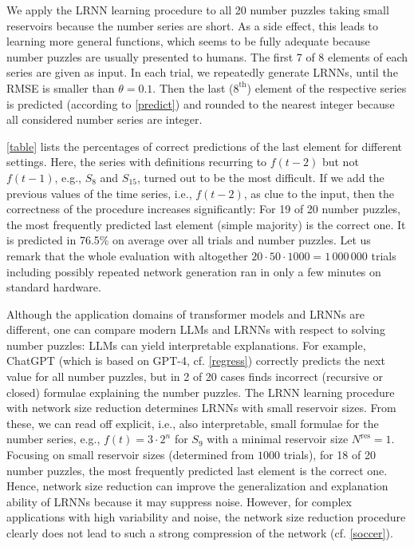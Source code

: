 \documentclass{sn-jnl}
\theoremstyle{definition}
\begin{document}
We apply the LRNN learning procedure to all 20 number puzzles taking small
reservoirs because the number series are short. As a side effect, this leads to
learning more general functions, which seems to be fully adequate because number
puzzles are usually presented to humans. The first 7 of 8 elements of each
series are given as input. In each trial, we repeatedly generate LRNNs, until the
RMSE is smaller than $\theta=0.1$. Then the last ($8^\text{th}$) element of the
respective series is predicted (according to \cref{predict}) and rounded to the
nearest integer because all considered number series are integer.

\cref{table} lists the percentages of correct predictions of the last
element for different settings. Here, the series with definitions recurring to
$f(t-2)$ but not $f(t-1)$, e.g., $S_8$ and $S_{15}$, turned out to be the most
difficult. If we add the previous values of the time series, i.e., $f(t-2)$,
as clue to the input, then the correctness of the procedure increases
significantly: For 19 of 20 number puzzles, the most frequently predicted last
element (simple majority) is the correct one. It is predicted in 76.5\% on
average over all trials and number puzzles. Let us remark that the whole
evaluation with altogether $20 \cdot 50 \cdot 1000 = 1\,000\,000$ trials
including possibly repeated network generation ran in only a few minutes on
standard hardware.

Although the application domains of transformer models \cite{VS+17} and LRNNs are different,
one can compare modern LLMs and LRNNs with respect to solving number puzzles:
LLMs can yield interpretable explanations. For example, ChatGPT (which is based on
GPT-4, cf. \cref{regress}) correctly predicts the next value for all number
puzzles, but in 2 of 20 cases finds incorrect (recursive or closed) formulae explaining the number puzzles.
The LRNN learning procedure with network size reduction determines LRNNs with
small reservoir sizes. From these, we can read off explicit, i.e., also
interpretable, small formulae for the number series, e.g., $f(t) = 3 \cdot 2^n$
for $S_9$ with a minimal reservoir size $N^\mathrm{res}=1$. Focusing on small
reservoir sizes (determined from $1000$ trials), for 18 of 20 number puzzles,
the most frequently predicted last element is the correct one.
Hence, network size reduction can improve the generalization and explanation
ability of LRNNs because it may suppress noise. However, for complex applications with
high variability and noise, the network size reduction procedure clearly does
not lead to such a strong compression of the network (cf. \cref{soccer}).
\end{document}
